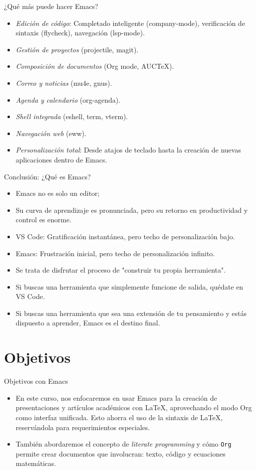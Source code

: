 \documentclass[presentation]{beamer}
\begin{document}
\begin{frame}[allowframebreaks]{¿Qué más puede hacer Emacs?}
\begin{itemize}
\item \emph{Edición de código}: Completado inteligente (company-mode),
verificación de sintaxis (flycheck), navegación (lsp-mode).
\item \emph{Gestión de proyectos} (projectile, magit).
\item \emph{Composición de documentos} (Org mode, AUCTeX).
\item \emph{Correo y noticias} (mu4e, gnus).
\item \emph{Agenda y calendario} (org-agenda).
\item \emph{Shell integrada} (eshell, term, vterm).
\item \emph{Navegación web} (eww).
\item \emph{Personalización total}: Desde atajos de teclado hasta la
creación de nuevas aplicaciones dentro de Emacs.
\end{itemize}
\end{frame}

\begin{frame}[allowframebreaks]{Conclusión: ¿Qué es Emacs?}
\begin{itemize}
\item Emacs no es solo un editor;
\item Su curva de aprendizaje es pronunciada, pero su retorno en
productividad y control es enorme.
\item \alert{\alert{VS Code:}} Gratificación instantánea, pero techo de personalización bajo.
\item \alert{\alert{Emacs:}} Frustración inicial, pero techo de personalización infinito.
\item Se trata de disfrutar el proceso de "construir tu propia herramienta".
\item Si buscas una herramienta que simplemente funcione de salida, quédate en VS Code.
\item Si buscas una herramienta que sea una \alert{\alert{extensión de tu
pensamiento}} y estás dispuesto a aprender, Emacs es el destino
final.
\end{itemize}
\end{frame}
\section{Objetivos}
\label{sec:org9b4c2cd}
\begin{frame}[label={sec:org8bb6b11},fragile]{Objetivos con Emacs}
 \begin{itemize}
\item En este curso, nos enfocaremos en usar Emacs  para la creación de
presentaciones y artículos académicos con \LaTeX, aprovechando el modo Org
como interfaz unificada. Esto ahorra el uso de la sintaxis de
\LaTeX, reservándola para requerimientos especiales.
\item También abordaremos el concepto de \emph{literate programming} y cómo
\texttt{Org} permite crear documentos que involucran: texto, código y
ecuaciones matemáticas.
\end{itemize}
\end{frame}
\end{document}
